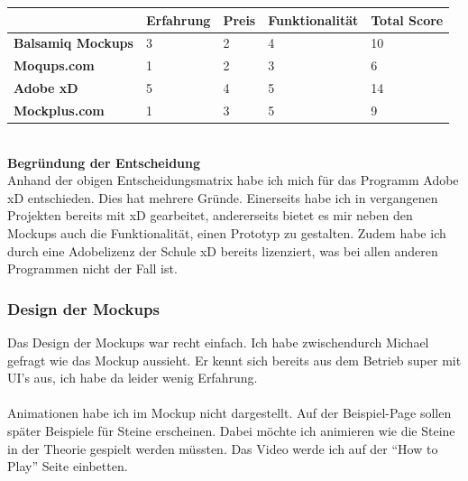 \documentclass[11pt]{article}
\begin{document}
    \begin{center}
        \begin{tabular}{ | p{4cm} | p{2.5cm} | p{2.5cm} | p{3cm} | p{2.5cm} | }
            \hline
            & \textbf{Erfahrung} & \textbf{Preis} & \textbf{Funktionalität} & \textbf{Total Score} \\ \hline
            \textbf{Balsamiq Mockups} & 3                  & 2              & 4                       & 10                   \\ \hline
            \textbf{Moqups.com}       & 1                  & 2              & 3                       & 6                    \\ \hline
            \textbf{Adobe xD}         & 5                  & 4              & 5                       & 14                   \\ \hline
            \textbf{Mockplus.com}     & 1                  & 3              & 5                       & 9                    \\ \hline
        \end{tabular}
    \end{center}
    \\
    \textbf{Begründung der Entscheidung}\\
    Anhand der obigen Entscheidungsmatrix habe ich mich für das Programm Adobe xD entschieden. Dies hat mehrere
    Gründe. Einerseits habe ich in vergangenen Projekten bereits mit xD gearbeitet, andererseits bietet es
    mir neben den Mockups auch die Funktionalität, einen Prototyp zu gestalten. Zudem habe ich durch eine
    Adobelizenz der Schule xD bereits lizenziert, was bei allen anderen Programmen nicht der Fall ist.

    \subsubsection{Design der Mockups}
    Das Design der Mockups war recht einfach. Ich habe zwischendurch Michael gefragt wie das Mockup aussieht. Er kennt
    sich bereits aus dem Betrieb super mit UI's aus, ich habe da leider wenig Erfahrung.
    \\\\Animationen habe ich im Mockup nicht dargestellt. Auf der Beispiel-Page sollen später Beispiele für Steine
    erscheinen. Dabei möchte ich animieren wie die Steine in der Theorie gespielt werden müssten.
    Das Video werde ich auf der ``How to Play'' Seite einbetten.
\end{document}
